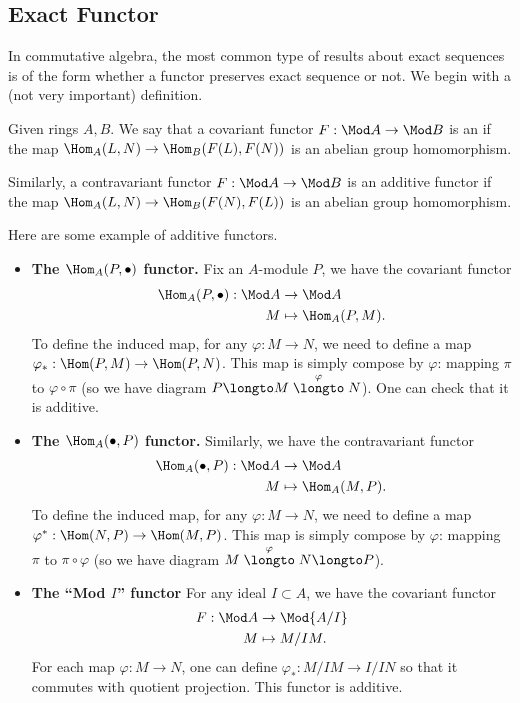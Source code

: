 \subsection{Exact Functor}
In commutative algebra, the most common type of results about exact sequences
is of the form whether a functor preserves exact sequence or not.
We begin with a (not very important) definition.
\begin{definition}
    Given rings $A,B$.
    We say that a covariant functor $F:\Mod A\to \Mod B$ is
    an  if the map $\Hom_A(L,N)\to \Hom_B(F(L),F(N))$
    is an abelian group homomorphism.

    Similarly, a contravariant functor $F:\Mod A\to\Mod B$
    is an additive functor if the map $\Hom_A(L,N)\to 
    \Hom_B(F(N),F(L))$ is an abelian group homomorphism.
\end{definition}
\begin{example}
    \label{ex:functors}
    Here are some example of additive functors.
    \begin{itemize}
    \item \textbf{The $\Hom_A(P,\bullet)$ functor.}
    Fix an $A$-module $P$, we have the covariant functor
    \begin{align*}
    \Hom_A(P,\bullet) : \Mod A & \to\Mod A \\
    M &\mapsto \Hom_A(P,M).
    \end{align*}
    To define the induced map, for any $\varphi : M\to N$,
    we need to define a map $\varphi_*: \Hom(P,M)\to \Hom(P,N)$.
    This map is simply compose by $\varphi$: mapping
    $\pi$ to $\varphi\circ \pi$
    (so we have diagram $P\longto M \stackrel\varphi\longto N$).
    One  can check that it is additive.
    
    \item \textbf{The $\Hom_A(\bullet, P)$ functor.}
    Similarly, we have the contravariant functor
    \begin{align*}
    \Hom_A(\bullet,P) : \Mod A & \to\Mod A \\
    M &\mapsto \Hom_A(M,P).
    \end{align*}
    To define the induced map, for any $\varphi : M\to N$,
    we need to define a map $\varphi^* : \Hom(N,P)\to \Hom(M,P)$.
    This map is simply compose by $\varphi$: mapping
    $\pi$ to $\pi\circ \varphi$
    (so we have diagram $M\stackrel\varphi\longto N \longto P$).
    \item \textbf{The ``Mod $I$'' functor}
    For any ideal $I\subset A$, we have the covariant functor
    \begin{align*}
        F : \Mod A &\to \Mod{A/I} \\
        M &\mapsto M/IM.
    \end{align*}
    For each map $\varphi : M\to N$, one can define
    $\varphi_* : M/IM \to I/IN$ so that
    it commutes with quotient projection.
    This functor is additive.
    \end{itemize}
\end{example}
